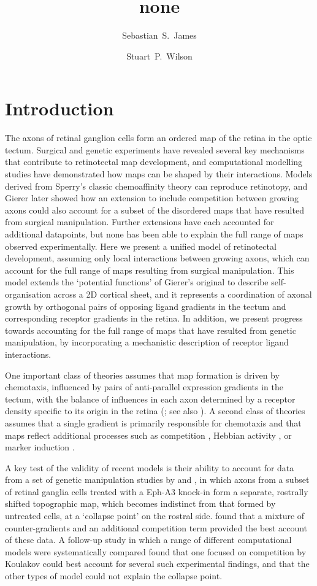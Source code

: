 \documentclass[9pt]{elife} %
\title {none}
\author[1]{Sebastian~S.~James}
\author[1*]{Stuart~P.~Wilson}
\affil[1]{Department of Psychology, The University of Sheffield, Sheffield, United Kingdom.}
\begin{document}
\section{Introduction}
The axons of retinal ganglion cells form an ordered map of the retina in the
optic tectum. Surgical and genetic experiments have revealed several key
mechanisms that contribute to retinotectal map development, and computational
modelling studies have demonstrated how maps can be shaped by their
interactions. Models derived from Sperry's classic chemoaffinity theory can
reproduce retinotopy, and Gierer later showed how an extension to include
competition between growing axons could also account for a subset of the
disordered maps that have resulted from surgical manipulation. Further
extensions have each accounted for additional datapoints, but none has been
able to explain the full range of maps observed experimentally. Here we
present a unified model of retinotectal development, assuming only local
interactions between growing axons, which can account for the full range of
maps resulting from surgical manipulation. This model extends the `potential
functions' of Gierer's original to describe self-organisation across a 2D
cortical sheet, and it represents a coordination of axonal growth by
orthogonal pairs of opposing ligand gradients in the tectum and corresponding
receptor gradients in the retina. In addition, we present progress towards
accounting for the full range of maps that have resulted from genetic
manipulation, by incorporating a mechanistic description of receptor ligand
interactions.

One important class of theories assumes that map formation is driven by
chemotaxis, influenced by pairs of anti-parallel expression gradients in the
tectum, with the balance of influences in each axon determined by a receptor
density specific to its origin in the retina
(\citealp{Gierer1983,Gierer1987,Simpson2011}; see also
\citealp{Karbowski2004,James2020}). A second class of theories assumes that a
single gradient is primarily responsible for chemotaxis and that maps reflect
additional processes such as competition \citep{Triplett2011}, Hebbian
activity \citep{Tsigankov2006,Tsigankov2010}, or marker induction
\citep{Prestige1975,Willshaw2006}.

A key test of the validity of recent models is their ability to account for
data from a set of genetic manipulation studies by
\cite{brown_topographic_2000} and \cite{reber_relative_2004}, in which axons
from a subset of retinal ganglia cells treated with a Eph-A3 knock-in form a
separate, rostrally shifted topographic map, which becomes indistinct from
that formed by untreated cells, at a `collapse point' on the rostral
side. \cite{Sterratt2013} found that a mixture of counter-gradients and an
additional competition term provided the best account of these data. A
follow-up study in which a range of different computational models were
systematically compared \citep{hjorth_quantitative_2015} found that one
focused on competition by Koulakov \citep{Triplett2011} could best account for
several such experimental findings, and that the other types of model could
not explain the collapse point.
\end{document}
